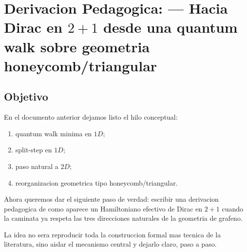 \chapter{Derivacion Pedagogica: --- Hacia Dirac en \(2+1\) desde una quantum walk sobre geometria honeycomb/triangular}
\label{ch:dirac-2p1-desde-qw-honeycomb}







\section{Objetivo}

En el documento anterior dejamos listo el hilo conceptual:

\begin{enumerate}[leftmargin=*]
  \item quantum walk minima en \(1D\);
  \item split-step en \(1D\);
  \item paso natural a \(2D\);
  \item reorganizacion geometrica tipo honeycomb/triangular.
\end{enumerate}

Ahora queremos dar el siguiente paso de verdad: escribir una derivacion pedagogica de como aparece un Hamiltoniano efectivo de Dirac en \(2+1\) cuando la caminata ya respeta las tres direcciones naturales de la geometria de grafeno.

La idea no sera reproducir toda la construccion formal mas tecnica de la literatura, sino aislar el mecanismo central y dejarlo claro, paso a paso.

